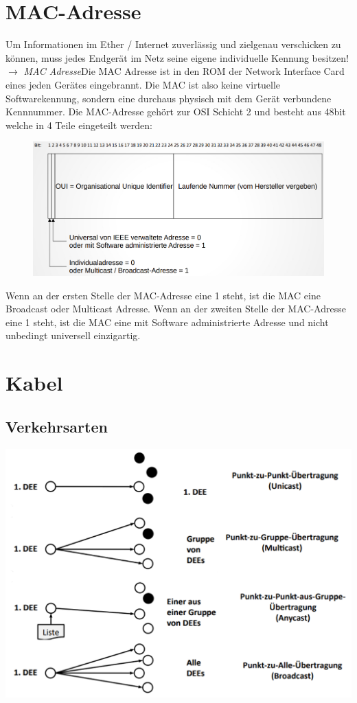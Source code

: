 \documentclass[12pt,a4paper]{article}
\begin{document}
	\section{MAC-Adresse}
		Um Informationen im Ether / Internet zuverlässig und zielgenau verschicken zu können, muss jedes Endgerät im Netz seine eigene individuelle Kennung besitzen!\newline $\longrightarrow$ \emph{MAC Adresse}\newline Die MAC Adresse ist in den ROM der Network Interface Card eines jeden Gerätes eingebrannt. Die MAC ist also keine virtuelle Softwarekennung, sondern eine durchaus physisch mit dem Gerät verbundene Kennnummer. Die MAC-Adresse gehört zur OSI Schicht 2 und besteht aus 48bit welche in 4 Teile eingeteilt werden:
		\begin{center}
			\begin{figure}[!h]
				\includegraphics[width=\textwidth]{Bilder/MAC-Adresse.PNG}
			\end{figure}
		\end{center}
		Wenn an der ersten Stelle der MAC-Adresse eine 1 steht, ist die MAC eine Broadcast oder Multicast Adresse.
		Wenn an der zweiten Stelle der MAC-Adresse eine 1 steht, ist die MAC eine mit Software administrierte Adresse und nicht unbedingt universell einzigartig.

	\section{Kabel}
		\subsection{Verkehrsarten}
			\includegraphics[width=\textwidth]{Bilder/Verkehrsarten.PNG}
\end{document}
